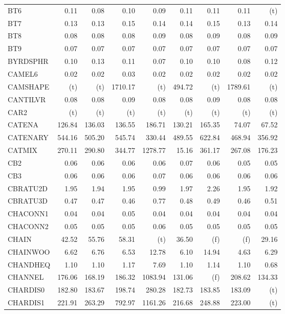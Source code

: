 \documentclass[11pt,twoside]{article}
\begin{document}
{\begin{longtable}[c]{|l|r|r|r|r|r|r|r|r|}
BT6 & 0.11 & 0.08 & 0.10 & 0.09 & 0.11 & 0.11 & 0.11 & (t) \\
BT7 & 0.13 & 0.13 & 0.15 & 0.14 & 0.14 & 0.15 & 0.13 & 0.14 \\
BT8 & 0.08 & 0.08 & 0.08 & 0.09 & 0.08 & 0.09 & 0.08 & 0.09 \\
BT9 & 0.07 & 0.07 & 0.07 & 0.07 & 0.07 & 0.07 & 0.07 & 0.07 \\
BYRDSPHR & 0.10 & 0.13 & 0.11 & 0.07 & 0.10 & 0.10 & 0.08 & 0.12 \\
CAMEL6 & 0.02 & 0.02 & 0.03 & 0.02 & 0.02 & 0.02 & 0.02 & 0.02 \\
CAMSHAPE & (t) & (t) & 1710.17 & (t) & 494.72 & (t) & 1789.61 & (t) \\
CANTILVR & 0.08 & 0.08 & 0.09 & 0.08 & 0.08 & 0.09 & 0.08 & 0.08 \\
CAR2 & (t) & (t) & (t) & (t) & (t) & (t) & (t) & (t) \\
CATENA & 126.84 & 136.03 & 136.55 & 186.71 & 130.21 & 165.35 & 74.07 & 67.52 \\
CATENARY & 544.16 & 505.20 & 545.74 & 330.44 & 489.55 & 622.84 & 468.94 & 356.92 \\
CATMIX & 270.11 & 290.80 & 344.77 & 1278.77 & 15.16 & 361.17 & 267.08 & 176.23 \\
CB2 & 0.06 & 0.06 & 0.06 & 0.06 & 0.07 & 0.06 & 0.05 & 0.05 \\
CB3 & 0.06 & 0.06 & 0.06 & 0.07 & 0.06 & 0.06 & 0.06 & 0.06 \\
CBRATU2D & 1.95 & 1.94 & 1.95 & 0.99 & 1.97 & 2.26 & 1.95 & 1.92 \\
CBRATU3D & 0.47 & 0.47 & 0.46 & 0.77 & 0.48 & 0.49 & 0.46 & 0.51 \\
CHACONN1 & 0.04 & 0.04 & 0.05 & 0.04 & 0.04 & 0.04 & 0.04 & 0.04 \\
CHACONN2 & 0.05 & 0.05 & 0.05 & 0.06 & 0.05 & 0.05 & 0.05 & 0.05 \\
CHAIN & 42.52 & 55.76 & 58.31 & (t) & 36.50 & (f) & (f) & 29.16 \\
CHAINWOO & 6.62 & 6.76 & 6.53 & 12.78 & 6.10 & 14.94 & 4.63 & 6.29 \\
CHANDHEQ & 1.10 & 1.10 & 1.17 & 7.69 & 1.10 & 1.14 & 1.10 & 0.68 \\
CHANNEL & 176.06 & 168.19 & 186.32 & 1083.94 & 131.06 & (f) & 208.62 & 134.33 \\
CHARDIS0 & 182.80 & 183.67 & 198.74 & 280.28 & 182.73 & 183.85 & 183.09 & (t) \\
CHARDIS1 & 221.91 & 263.29 & 792.97 & 1161.26 & 216.68 & 248.88 & 223.00 & (t) \\

\end{longtable}}
\end{document}
